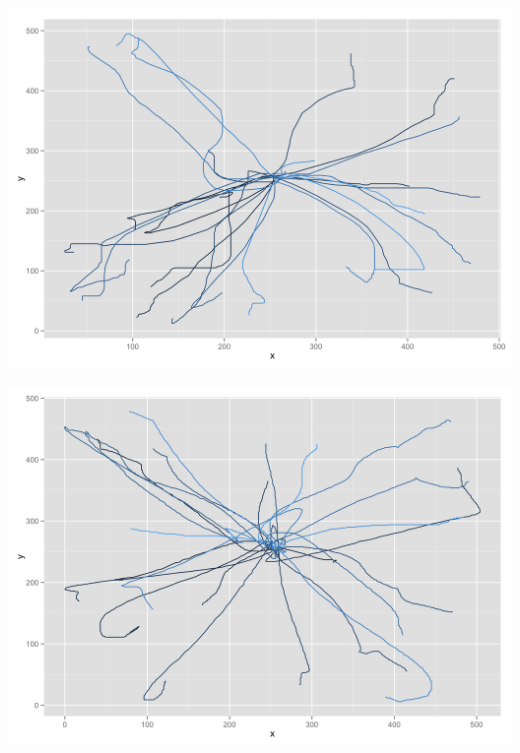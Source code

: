 \begin{appendices}
\begin{minipage}{\textwidth}
\begin{minipage}{0.5\linewidth}
	\end{minipage}
	\label{fig:kvaliativ_persons_2}
\end{minipage}


\begin{minipage}{\textwidth}
	\begin{minipage}{0.5\linewidth}
		\includegraphics[width=\linewidth]{images/plots/plot_analysis_qualitative_257}
	\end{minipage}
		\begin{minipage}{0.5\linewidth}
		\includegraphics[width=\linewidth]{images/plots/plot_analysis_qualitative_114}
	\end{minipage}
	\begin{minipage}{0.5\linewidth}

\end{minipage}
\end{minipage}
\end{appendices}
